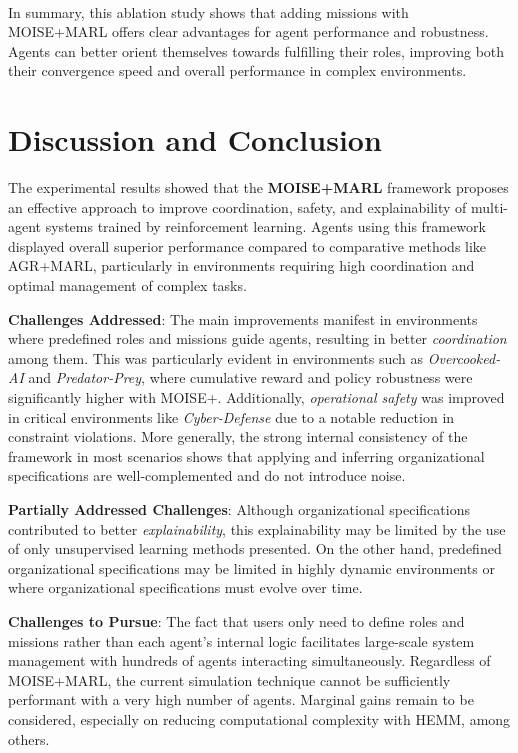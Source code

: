 \documentclass[sigconf,anonymous]{aamas}
\begin{document}
\

In summary, this ablation study shows that adding missions with MOISE+MARL offers clear advantages for agent performance and robustness. Agents can better orient themselves towards fulfilling their roles, improving both their convergence speed and overall performance in complex environments.


\section{Discussion and Conclusion}
\label{sec:discussion_conclusion}


The experimental results showed that the \textbf{MOISE+MARL} framework proposes an effective approach to improve coordination, safety, and explainability of multi-agent systems trained by reinforcement learning. Agents using this framework displayed overall superior performance compared to comparative methods like AGR+MARL, particularly in environments requiring high coordination and optimal management of complex tasks.

\textbf{Challenges Addressed}: The main improvements manifest in environments where predefined roles and missions guide agents, resulting in better \textit{coordination} among them. This was particularly evident in environments such as \textit{Overcooked-AI} and \textit{Predator-Prey}, where cumulative reward and policy robustness were significantly higher with MOISE+. Additionally, \textit{operational safety} was improved in critical environments like \textit{Cyber-Defense} due to a notable reduction in constraint violations. More generally, the strong internal consistency of the framework in most scenarios shows that applying and inferring organizational specifications are well-complemented and do not introduce noise.

\textbf{Partially Addressed Challenges}: Although organizational specifications contributed to better \textit{explainability}, this explainability may be limited by the use of only unsupervised learning methods presented. On the other hand, predefined organizational specifications may be limited in highly dynamic environments or where organizational specifications must evolve over time.

\textbf{Challenges to Pursue}: The fact that users only need to define roles and missions rather than each agent's internal logic facilitates large-scale system management with hundreds of agents interacting simultaneously. Regardless of MOISE+MARL, the current simulation technique cannot be sufficiently performant with a very high number of agents. Marginal gains remain to be considered, especially on reducing computational complexity with HEMM, among others.
\end{document}
